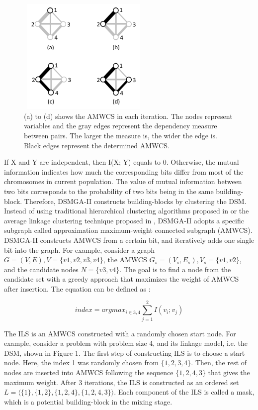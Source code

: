\documentclass{sig-alternate-05-2015}
\begin{document}
\begin{figure}
\centering
\includegraphics[height=2.2in, width=2.5in]{AMWCS1edge}
\caption{(a) to (d) shows the AMWCS in each iteration. The nodes represent variables and the gray edges represent the dependency measure between pairs. The larger the measure is, the wider the edge is. Black  edges represent the determined AMWCS.}
\end{figure}


If X and Y are independent, then I(X; Y) equals to 0. Otherwise, the mutual information indicates how much the corresponding bits differ from most of the chromosomes in current population. The value of mutual information between two bits corresponds to the probability of two bits being in the same building-block. Therefore, DSMGA-II constructs building-blocks by clustering the DSM. Instead of using traditional hierarchical clustering algorithms proposed in \cite{thierens:LTGA} or the average linkage clustering technique proposed in \cite{thierens:OM}, DSMGA-II adopts a specific subgraph called approximation maximum-weight connected subgraph (AMWCS). DSMGA-II constructs AMWCS from a certain bit,  and iteratively adds one single bit into the graph. For example, consider a  graph $G = (V, E), V = \{v1 ,v2, v3, v4\}$, the AMWCS $G_{s} =(V_{s}, E_{s}), V_{s} =\{v1 , v2\}$, and the candidate nodes $N =\{v3 ,v4\}$. The goal is to find a node from the candidate set with a greedy approach that maximizes the weight of AMWCS after insertion. The equation can be defined as : 

\begin{equation} \textit{index} = argmax_{i\in 3,4}\sum_{j=1}^{2} I(v_i;v_j) \end{equation}

The ILS  is an AMWCS constructed with a randomly chosen start node. For example, consider a problem with problem size  4, and its linkage model, i.e. the DSM, shown in Figure 1. The first step of constructing ILS is to choose a start node. Here, the index 1 was randomly chosen from $\{1, 2, 3, 4\}$. Then, the rest of nodes are inserted into AMWCS following the sequence $\{1,2,4,3\}$ that gives the maximum weight. After 3 iterations, the ILS is constructed as an ordered set $L = \langle\{1\}, \{1, 2\}, \{1, 2, 4\}, \{1, 2, 4, 3\} \rangle$. Each component of the ILS is called a mask, which is a potential  building-block in the mixing stage. 
\end{document}
